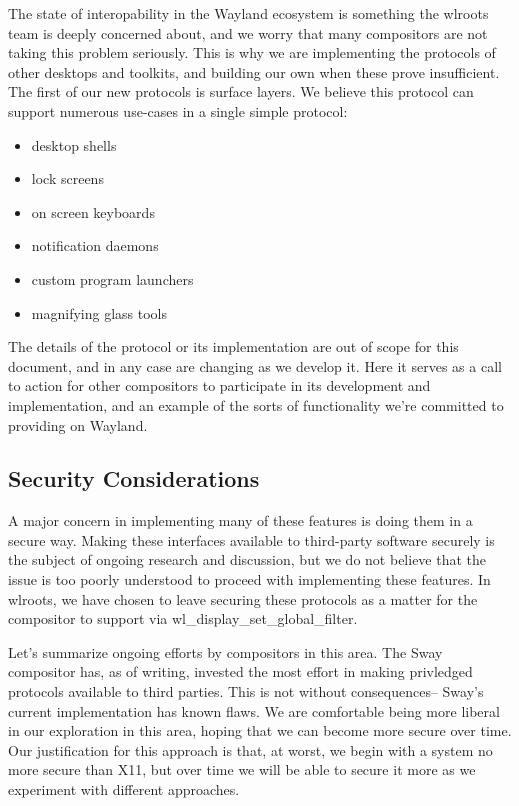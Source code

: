 \documentclass{article}
\begin{document}
The state of interopability in the Wayland ecosystem is something the wlroots
team is deeply concerned about, and we worry that many compositors are not
taking this problem seriously. This is why we are implementing the protocols of
other desktops and toolkits, and building our own when these prove insufficient.
The first of our new protocols is surface layers. We believe this protocol can
support numerous use-cases in a single simple protocol:

\begin{itemize}
    \item desktop shells
    \item lock screens
    \item on screen keyboards
    \item notification daemons
    \item custom program launchers
    \item magnifying glass tools
\end{itemize}

The details of the protocol or its implementation are out of scope for this
document, and in any case are changing as we develop it. Here it serves as a
call to action for other compositors to participate in its development and
implementation, and an example of the sorts of functionality we're committed to
providing on Wayland.

\subsection{Security Considerations}

A major concern in implementing many of these features is doing them in a
secure way. Making these interfaces available to third-party software securely
is the subject of ongoing research and discussion, but we do not believe that
the issue is too poorly understood to proceed with implementing these features.
In wlroots, we have chosen to leave securing these protocols as a matter for the
compositor to support via wl_display_set_global_filter.

Let's summarize ongoing efforts by compositors in this area. The Sway compositor
has, as of writing, invested the most effort in making privledged protocols
available to third parties. This is not without consequences-- Sway's current
implementation has known flaws. We are comfortable being more liberal in our
exploration in this area, hoping that we can become more secure over time. Our
justification for this approach is that, at worst, we begin with a system no
more secure than X11, but over time we will be able to secure it more as we
experiment with different approaches.
\end{document}
